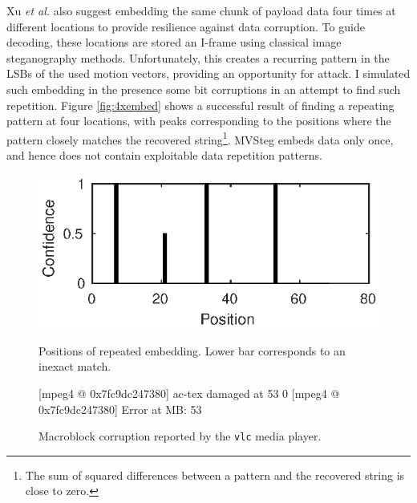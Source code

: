 \documentclass[12pt,british,twoside,notitlepage,usenames,dvipsnames,hypens,final]{report}
\numberwithin{equation}{section}
\numberwithin{figure}{section}
\renewenvironment{alltt}{\vspace{-0.6\baselineskip}\begin{oldalltt}}{\end{oldalltt}\vspace{-0.1\baselineskip}}
\begin{document}
Xu \emph{et al.} also suggest embedding the same chunk of payload data four times at different locations to provide resilience against data corruption. To guide decoding, these locations are stored an I-frame using classical image steganography methods. Unfortunately, this creates a recurring pattern in the LSBs of the used motion vectors, providing an opportunity for attack. I simulated such embedding in the presence some bit corruptions in an attempt to find such repetition. Figure \ref{fig:4xembed} shows a successful result of finding a repeating pattern at four locations, with peaks corresponding to the positions where the pattern closely matches the recovered string\footnote{The sum of squared differences between a pattern and the recovered string is close to zero.}. MVSteg embeds data only once, and hence does not contain exploitable data repetition patterns.

\begin{figure}[tbh]
\centering
\begin{minipage}[t]{.45\textwidth}
  \centering
  \captionsetup{width=\textwidth}
  \includegraphics[scale=0.9]{img/4xembed.eps}
  \caption{Positions of repeated embedding. Lower bar corresponds to an inexact match.}
  \label{fig:4xembed}
\end{minipage}%
\quad
\begin{minipage}[t]{.45\textwidth}
  \vspace{-5.14em}
  \captionsetup{width=\textwidth}
  \begingroup
    \fontsize{11pt}{12pt}\selectfont
    \centering
    \begin{alltt}
 {\color{blue}[mpeg4 @ 0x7fc9dc247380]}
            {\color{red}ac-tex damaged at 53 0}
 {\color{blue}[mpeg4 @ 0x7fc9dc247380]}
                   {\color{red}Error at MB: 53}

    \end{alltt}
  \endgroup
  \caption{Macroblock corruption reported by the \texttt{vlc} media player.}
  \label{fig:vlc-corruption}
\end{minipage}
\end{figure}
\end{document}
